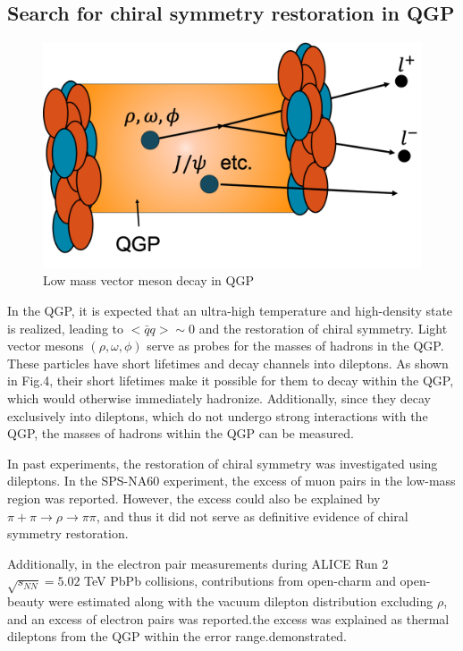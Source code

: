     \subsection{Search for chiral symmetry restoration in QGP}
        \begin{figure}[hbtp]
            \centering
            \includegraphics[keepaspectratio, scale=0.2]{fig/1_7_Search_for_chiral.png}
            \caption{Low mass vector meson decay in QGP}
            \label{Intro:Search_for_CSR:Low_mass_vector_meson_decay_in_QGP}
        \end{figure}
        
        In the QGP, it is expected that an ultra-high temperature and high-density state is realized, leading to $ < \bar{q}q > \sim 0 $ and the restoration of chiral symmetry. Light vector mesons $(\rho, \omega, \phi)$ serve as probes for the masses of hadrons in the QGP. These particles have short lifetimes and decay channels into dileptons. As shown in Fig.4, their short lifetimes make it possible for them to decay within the QGP, which would otherwise immediately hadronize. Additionally, since they decay exclusively into dileptons, which do not undergo strong interactions with the QGP, the masses of hadrons within the QGP can be measured.  
        
        In past experiments, the restoration of chiral symmetry was investigated using dileptons. In the SPS-NA60 experiment, the excess of muon pairs in the low-mass region was reported. However, the excess could also be explained by $\pi + \pi \rightarrow \rho \rightarrow \pi \pi$, and thus it did not serve as definitive evidence of chiral symmetry restoration\cite{NA60}.  
        
        Additionally, in the electron pair measurements during ALICE Run 2 $\sqrt{s_{NN}} = 5.02$ TeV PbPb collisions, contributions from open-charm and open-beauty were estimated along with the vacuum dilepton distribution excluding $\rho$, and an excess of electron pairs was reported.the excess was explained as thermal dileptons from the QGP within the error range.demonstrated\cite{ALICE:2023jef}.  
        

